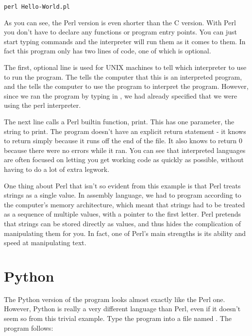 \begin{simpletyping}
\begin{lstlisting}
perl Hello-World.pl
\end{lstlisting}
\end{simpletyping}

As you can see, the Perl version is even shorter than the C version.
With Perl you don't have to declare any functions or program entry points.
You can just start typing commands and the interpreter will run them
as it comes to them.  In fact this program only has two lines of code,
one of which is optional.

The first, optional line is used for UNIX machines to tell which interpreter
to use to run the program.  The \icode{\#!} tells the computer
that this is an interpreted program, and the 
 tells the computer to use the program
 to interpret the program.  However, since
we ran the program by typing in , we
had already specified that we were using the perl interpreter.

The next line calls a Perl builtin function, print.  This has one parameter,
the string to print.  The program doesn't have an explicit return
statement - it knows to return simply because it runs off the end of the file.
It also knows to return 0 because there were no errors while it ran.  You can
see that interpreted languages are often focused on letting you get working 
code as quickly as possible, without having to do a lot of extra legwork.

One thing about Perl that isn't so evident from this example is that Perl
treats strings as a single value.  In assembly language, we had to program
according to the computer's memory architecture, which meant that strings
had to be treated as a sequence of multiple values, with a pointer to the
first letter.  Perl pretends that strings can be stored directly as values,
and thus hides the complication of manipulating them for you.  In fact,
one of Perl's main strengths is its ability and speed at manipulating
text.  

\section{Python}

The Python version of the program looks almost exactly like the Perl one.
However, Python is really a very different language than Perl, even if
it doesn't seem so from this trivial example.  Type the program into
a file named .  The program follows:

